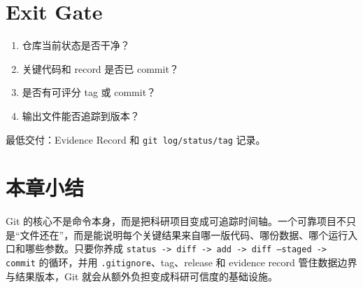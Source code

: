 \section{Exit Gate}

\begin{enumerate}
    \item 仓库当前状态是否干净？
    \item 关键代码和 record 是否已 commit？
    \item 是否有可评分 tag 或 commit？
    \item 输出文件能否追踪到版本？
\end{enumerate}

最低交付：Evidence Record 和 \texttt{git log/status/tag} 记录。

\section{本章小结}

Git 的核心不是命令本身，而是把科研项目变成可追踪时间轴。一个可靠项目不只是“文件还在”，而是能说明每个关键结果来自哪一版代码、哪份数据、哪个运行入口和哪些参数。只要你养成 \texttt{status -> diff -> add -> diff --staged -> commit} 的循环，并用 \texttt{.gitignore}、tag、release 和 evidence record 管住数据边界与结果版本，Git 就会从额外负担变成科研可信度的基础设施。
